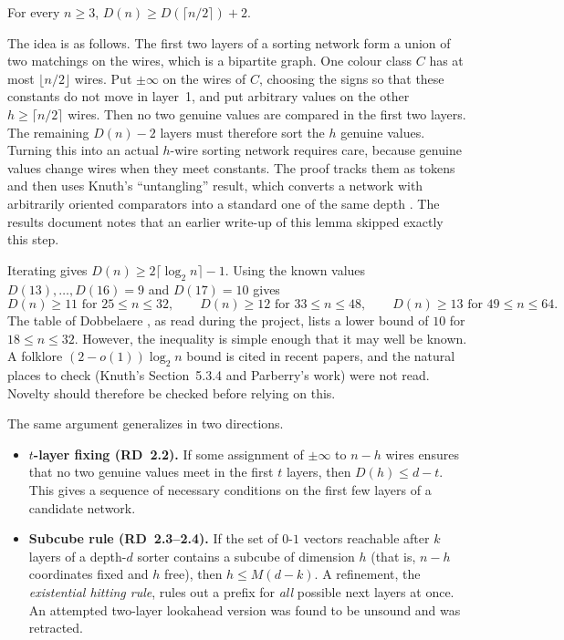 \begin{theorem}\label{thm:halving}
For every $n \ge 3$, $D(n) \ge D(\lceil n/2 \rceil) + 2$.
\end{theorem}

The idea is as follows. The first two layers of a sorting network form a union of two matchings on the wires, which is a bipartite graph. One colour class $C$ has at most $\lfloor n/2 \rfloor$ wires. Put $\pm\infty$ on the wires of $C$, choosing the signs so that these constants do not move in layer~1, and put arbitrary values on the other $h \ge \lceil n/2 \rceil$ wires. Then no two genuine values are compared in the first two layers. The remaining $D(n) - 2$ layers must therefore sort the $h$ genuine values. Turning this into an actual $h$-wire sorting network requires care, because genuine values change wires when they meet constants. The proof tracks them as tokens and then uses Knuth's ``untangling'' result, which converts a network with arbitrarily oriented comparators into a standard one of the same depth \cite[Exercise 5.3.4.16]{knuth1998art}. The results document notes that an earlier write-up of this lemma skipped exactly this step.

Iterating gives $D(n) \ge 2\lceil \log_2 n \rceil - 1$. Using the known values $D(13), \dots, D(16) = 9$ and $D(17) = 10$ \cite{bundala2014optimal, codish2019end} gives
\[
D(n) \ge 11 \text{ for } 25 \le n \le 32, \qquad D(n) \ge 12 \text{ for } 33 \le n \le 48, \qquad D(n) \ge 13 \text{ for } 49 \le n \le 64.
\]
The table of Dobbelaere \cite{dobbelaere}, as read during the project, lists a lower bound of $10$ for $18 \le n \le 32$. However, the inequality is simple enough that it may well be known. A folklore $(2-o(1))\log_2 n$ bound is cited in recent papers, and the natural places to check (Knuth's Section~5.3.4 and Parberry's work) were not read. Novelty should therefore be checked before relying on this.

The same argument generalizes in two directions.
\begin{itemize}
    \item \textbf{$t$-layer fixing (RD~2.2).} If some assignment of $\pm\infty$ to $n-h$ wires ensures that no two genuine values meet in the first $t$ layers, then $D(h) \le d - t$. This gives a sequence of necessary conditions on the first few layers of a candidate network.
    \item \textbf{Subcube rule (RD~2.3--2.4).} If the set of $0$-$1$ vectors reachable after $k$ layers of a depth-$d$ sorter contains a subcube of dimension $h$ (that is, $n-h$ coordinates fixed and $h$ free), then $h \le M(d-k)$. A refinement, the \emph{existential hitting rule}, rules out a prefix for \emph{all} possible next layers at once. An attempted two-layer lookahead version was found to be unsound and was retracted.
\end{itemize}

